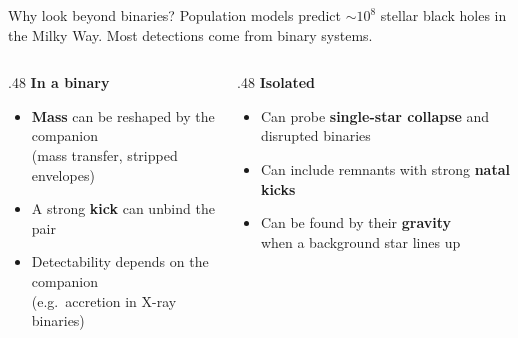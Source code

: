 \begin{frame}{Why look beyond binaries?}
\vspace{1mm}
Population models predict $\sim\!10^8$ stellar black holes in the Milky Way. Most detections come from binary systems.
\vspace{3mm}

\begin{columns}[T]
\begin{column}{.48\linewidth}
\textbf{In a binary}
\begin{itemize}\setlength{\itemsep}{5pt}
  \item<2-> \textbf{Mass} can be reshaped by the companion\\ {\small (mass transfer, stripped envelopes)}
  \item<2-> A strong \textbf{kick} can unbind the pair
  \item<2-> Detectability depends on the companion\\ {\small (e.g.\ accretion in X-ray binaries)}
\end{itemize}
\end{column}
\begin{column}{.48\linewidth}
\textbf{Isolated}
\begin{itemize}\setlength{\itemsep}{5pt}
  \item<2-> Can probe \textbf{single-star collapse} and disrupted binaries
  \item<2-> Can include remnants with strong \textbf{natal kicks}
  \item<2-> Can be found by their \textbf{gravity}\\ when a background star lines up
\end{itemize}
\end{column}
\end{columns}
\vfill
{}
\vfill
{}
\end{frame}
